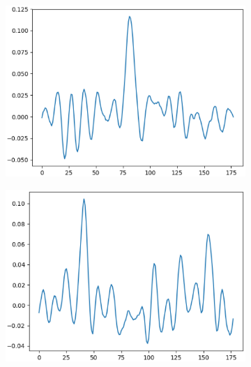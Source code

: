 \documentclass[12pt]{article}
\begin{document}
\begin{figure}
\begin{subfigure}{.5\textwidth}
  \centering
  \includegraphics[width=.8\linewidth]{figures/stack_50_50_dropout_elu/weights_neuron_2.eps}
\end{subfigure}%
\begin{subfigure}{.5\textwidth}
  \centering
  \includegraphics[width=.8\linewidth]{figures/stack_50_50_dropout_elu/weights_neuron_3.eps}
\end{subfigure}


\end{figure}
\end{document}
